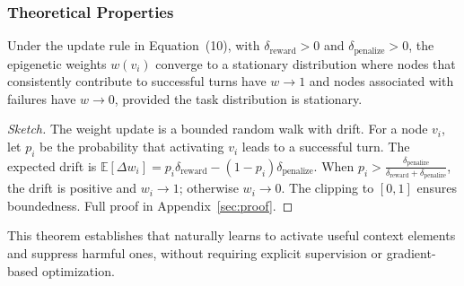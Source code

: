 \subsubsection{Theoretical Properties}

\begin{theorem}
Under the update rule in Equation~(10), with $\delta_{\text{reward}} > 0$ and $\delta_{\text{penalize}} > 0$, the epigenetic weights $w(v_i)$ converge to a stationary distribution where nodes that consistently contribute to successful turns have $w \to 1$ and nodes associated with failures have $w \to 0$, provided the task distribution is stationary.
\end{theorem}

\begin{proof}[Sketch]
The weight update is a bounded random walk with drift. For a node $v_i$, let $p_i$ be the probability that activating $v_i$ leads to a successful turn. The expected drift is $\mathbb{E}[\Delta w_i] = p_i \delta_{\text{reward}} - (1-p_i) \delta_{\text{penalize}}$. When $p_i > \frac{\delta_{\text{penalize}}}{\delta_{\text{reward}} + \delta_{\text{penalize}}}$, the drift is positive and $w_i \to 1$; otherwise $w_i \to 0$. The clipping to $[0,1]$ ensures boundedness. Full proof in Appendix~\ref{sec:proof}.
\end{proof}

This theorem establishes that \EpiContext{} naturally learns to activate useful context elements and suppress harmful ones, without requiring explicit supervision or gradient-based optimization.